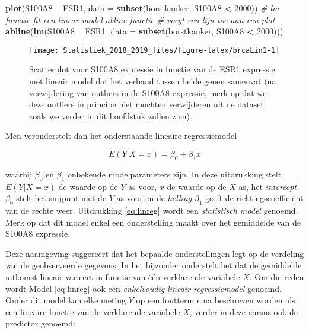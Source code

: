 \documentclass[12pt,dutch,coursenotes]{book}
\newenvironment{Shaded}{\begin{snugshade}}{\end{snugshade}}
\newcommand{\KeywordTok}[1]{\textcolor[rgb]{0.13,0.29,0.53}{\textbf{#1}}}
\newcommand{\DataTypeTok}[1]{\textcolor[rgb]{0.13,0.29,0.53}{#1}}
\newcommand{\DecValTok}[1]{\textcolor[rgb]{0.00,0.00,0.81}{#1}}
\newcommand{\StringTok}[1]{\textcolor[rgb]{0.31,0.60,0.02}{#1}}
\newcommand{\CommentTok}[1]{\textcolor[rgb]{0.56,0.35,0.01}{\textit{#1}}}
\newcommand{\OperatorTok}[1]{\textcolor[rgb]{0.81,0.36,0.00}{\textbf{#1}}}
\newcommand{\NormalTok}[1]{#1}
\theoremstyle{definition}
\theoremstyle{definition}
\theoremstyle{definition}
\theoremstyle{remark}
\begin{document}
\begin{Shaded}
\begin{Highlighting}[]
\KeywordTok{plot}\NormalTok{(S100A8 }\OperatorTok{~}\StringTok{ }\NormalTok{ESR1, }\DataTypeTok{data =} \KeywordTok{subset}\NormalTok{(borstkanker, S100A8 }\OperatorTok{<}\StringTok{ }
\StringTok{    }\DecValTok{2000}\NormalTok{))}
\CommentTok{# lm functie fit een linear model abline functie}
\CommentTok{# voegt een lijn toe aan een plot}
\KeywordTok{abline}\NormalTok{(}\KeywordTok{lm}\NormalTok{(S100A8 }\OperatorTok{~}\StringTok{ }\NormalTok{ESR1, }\DataTypeTok{data =} \KeywordTok{subset}\NormalTok{(borstkanker, }
\NormalTok{    S100A8 }\OperatorTok{<}\StringTok{ }\DecValTok{2000}\NormalTok{)))}
\end{Highlighting}
\end{Shaded}

\begin{figure}

{\centering \texttt{[image: Statistiek\_2018\_2019\_files/figure-latex/brcaLin1-1]} 

}

\caption{Scatterplot voor S100A8 expressie in functie van de ESR1 expressie met lineair model dat het verband tussen beide genen samenvat (na verwijdering van outliers in de S100A8 expressie, merk op dat we deze outliers in principe niet mochten verwijderen uit de dataset zoals we verder in dit hoofdstuk zullen zien).}\label{fig:brcaLin1}
\end{figure}

Men veronderstelt dan het onderstaande lineaire regressiemodel

\begin{equation} 
E(Y|X =x)=\beta_0 + \beta_1 x  \label{eq:linreg}
\end{equation}

waarbij \(\beta_0\) en \(\beta_1\) onbekende modelparameters zijn. In
deze uitdrukking stelt \(E(Y|X=x)\) de waarde op de \(Y\)-as voor, \(x\)
de waarde op de \(X\)-as, het \emph{intercept} \(\beta_0\) stelt het
snijpunt met de \(Y\)-as voor en de \emph{helling} \(\beta_1\) geeft de
richtingscoëfficiënt van de rechte weer. Uitdrukking \eqref{eq:linreg}
wordt een \emph{statistisch model} genoemd. Merk op dat dit model enkel
een onderstelling maakt over het gemiddelde van de S100A8 expressie.

Deze naamgeving suggereert dat het bepaalde onderstellingen legt op de
verdeling van de geobserveerde gegevens. In het bijzonder onderstelt het
dat de gemiddelde uitkomst lineair varieert in functie van één
verklarende variabele \(X\). Om die reden wordt Model \eqref{eq:linreg}
ook een \emph{enkelvoudig lineair regressiemodel} genoemd. Onder dit
model kan elke meting \(Y\) op een foutterm \(\epsilon\) na beschreven
worden als een lineaire functie van de verklarende variabele \(X\),
verder in deze cursus ook de predictor genoemd:
\end{document}
